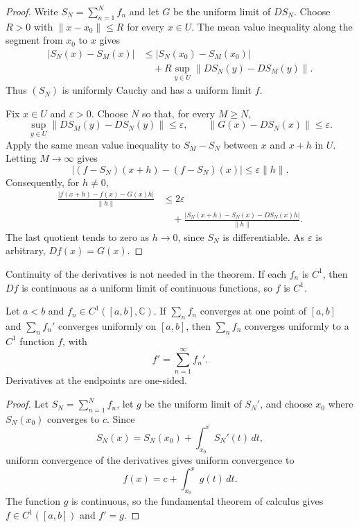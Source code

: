 \begin{proof}
Write $S_N=\sum_{n=1}^N f_n$ and let $G$
be the uniform limit of $DS_N$. Choose
$R>0$ with $\|x-x_0\|\leq R$ for every
$x\in U$. The mean value inequality along
the segment from $x_0$ to $x$ gives
$$
\begin{aligned}
|S_N(x)-S_M(x)|
&\leq |S_N(x_0)-S_M(x_0)|\\
&\quad+R\sup_{y\in U}
\|DS_N(y)-DS_M(y)\|.
\end{aligned}
$$
Thus $(S_N)$ is uniformly Cauchy and has a
uniform limit $f$.

Fix $x\in U$ and $\varepsilon>0$. Choose
$N$ so that, for every $M\geq N$,
$$
\sup_{y\in U}\|DS_M(y)-DS_N(y)\|
\leq\varepsilon,
\qquad
\|G(x)-DS_N(x)\|\leq\varepsilon.
$$
Apply the same mean value inequality to
$S_M-S_N$ between $x$ and $x+h$ in $U$.
Letting $M\to\infty$ gives
$$
|(f-S_N)(x+h)-(f-S_N)(x)|
\leq\varepsilon\|h\|.
$$
Consequently, for $h\ne0$,
$$
\begin{aligned}
\frac{|f(x+h)-f(x)-G(x)h|}{\|h\|}
&\leq 2\varepsilon\\
&\quad+
\frac{|S_N(x+h)-S_N(x)-DS_N(x)h|}
{\|h\|}.
\end{aligned}
$$
The last quotient tends to zero as
$h\to0$, since $S_N$ is differentiable.
As $\varepsilon$ is arbitrary, $Df(x)=G(x)$.
\end{proof}

\begin{remark}
\label{remark-continuous-derivatives-series}
Continuity of the derivatives is not needed
in the theorem. If each $f_n$ is $C^1$,
then $Df$ is continuous as a uniform limit
of continuous functions, so $f$ is $C^1$.
\end{remark}

\begin{corollary}
\label{lemma-differentiation-series-interval}
Let $a<b$ and $f_n\in C^1([a,b],\mathbb{C})$.
If $\sum_n f_n$ converges at one point of
$[a,b]$ and $\sum_n f_n'$ converges uniformly
on $[a,b]$, then $\sum_n f_n$ converges
uniformly to a $C^1$ function $f$, with
$$
f'=\sum_{n=1}^{\infty}f_n'.
$$
Derivatives at the endpoints are one-sided.
\end{corollary}

\begin{proof}
Let $S_N=\sum_{n=1}^N f_n$, let $g$ be the
uniform limit of $S_N'$, and choose $x_0$
where $S_N(x_0)$ converges to $c$. Since
$$
S_N(x)=S_N(x_0)+\int_{x_0}^x S_N'(t)\,dt,
$$
uniform convergence of the derivatives
gives uniform convergence to
$$
f(x)=c+\int_{x_0}^x g(t)\,dt.
$$
The function $g$ is continuous, so the
fundamental theorem of calculus gives
$f\in C^1([a,b])$ and $f'=g$.
\end{proof}

